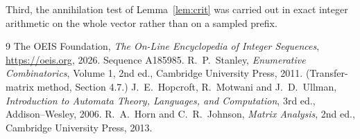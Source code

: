 \documentclass[11pt,a4paper]{article}
\theoremstyle{plain}
\theoremstyle{definition}
\begin{document}
Third, the annihilation test of Lemma~\ref{lem:crit} was carried out in exact integer
arithmetic on the whole vector rather than on a sampled prefix.

\begin{thebibliography}{9}
 The OEIS Foundation, \emph{The On-Line Encyclopedia of Integer
Sequences}, \url{https://oeis.org}, 2026. Sequence A185985.
 R.~P.~Stanley, \emph{Enumerative Combinatorics}, Volume 1, 2nd ed.,
Cambridge University Press, 2011. (Transfer-matrix method, Section 4.7.)
 J.~E.~Hopcroft, R.~Motwani and J.~D.~Ullman, \emph{Introduction to Automata
Theory, Languages, and Computation}, 3rd ed., Addison--Wesley, 2006.
 R.~A.~Horn and C.~R.~Johnson, \emph{Matrix Analysis}, 2nd ed., Cambridge
University Press, 2013.
\end{thebibliography}
\end{document}
